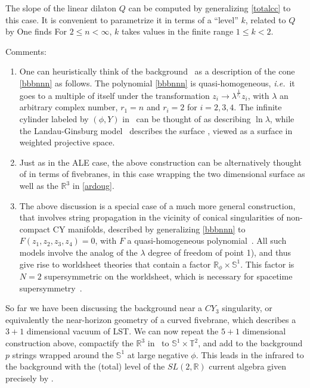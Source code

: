 \documentclass[12pt]{article}
\def\sltwo{\ensuremath{SL(2,\bR)}}
\def\ie{{i.e.}}
\def\half{\frac12}
\newcommand{\bR}{{\mathbb R}}
\newcommand{\bS}{{\mathbb S}}
\newcommand{\bT}{{\mathbb T}}
\newcommand{\bZ}{{\mathbb Z}}
\numberwithin{equation}{section}
\def\ie{{\it i.e.}}
\def\half{\frac12}
\def\ie{{\it i.e.}}
\begin{document}
The slope of the linear dilaton $Q$ can be computed by generalizing \eqref{totalcc} to this case. It is convenient to parametrize it in terms of a ``level'' $k$, related to $Q$ by
One finds
\eqn[knad]{\frac{1}{k}-\frac{1}{n}=\half
~~\Longrightarrow~~
k=\frac{2n}{n+2} ~.}
For $2\le n<\infty$, $k$ takes values in the finite range $1\le k<2$.  

\bigskip
\noindent
Comments:
\begin{enumerate}[1)]
\item One can heuristically think of the background \ardoug\ as a description of the cone \eqref{bbbnnn} as follows. The polynomial \eqref{bbbnnn} is quasi-homogeneous, \ie\ it goes to a multiple of itself under the transformation $z_i\to\lambda^{\frac{1}{r_i}}z_i$, with $\lambda$ an arbitrary complex number, $r_1=n$ and $r_i=2$ for $i=2,3,4$. The infinite cylinder labeled by $(\phi,Y)$ in \ardoug\ can be thought of as describing $\ln\lambda$, while the Landau-Ginsburg model \lgnn\ describes the surface \bbbnnn, viewed as a surface in weighted projective space.  
\item Just as in the ALE case, the above construction can be alternatively thought of in terms of fivebranes, in this case wrapping the two dimensional surface 
as well as the $\bR^3$ in \eqref{ardoug}.
\item The above discussion is a special case of a much more general construction, that involves string propagation in the vicinity of conical singularities of non-compact CY manifolds, described by generalizing \eqref{bbbnnn} to $F(z_1,z_2,z_3,z_4)=0$, with $F$ a quasi-homogeneous polynomial~. All such models involve the analog of the $\lambda$ degree of freedom of point 1), and thus give rise to worldsheet theories that contain a factor $\bR_\phi\times \bS^1$. This factor is $N=2$ supersymmetric on the worldsheet, which is necessary for spacetime supersymmetry~.   
\end{enumerate}

\noindent
So far we have been discussing the background near a $CY_3$ singularity, or equivalently the near-horizon geometry of a curved fivebrane, which describes a $3+1$ dimensional vacuum of LST. We can now repeat the $5+1$ dimensional construction above, compactify the $\bR^3$ in \ardoug\ to $\bS^1\times \bT^2$, and add to the background $p$ strings wrapped around the $\bS^1$ at large negative $\phi$. This leads in the infrared to the background
\eqn[ardougads]{AdS_3\times \bT^2\times \big(\bS^1\times LG_n\big)/\bZ_n~,}
with the (total) level of the $\sltwo$ current algebra given precisely by \knad. 
\end{document}
